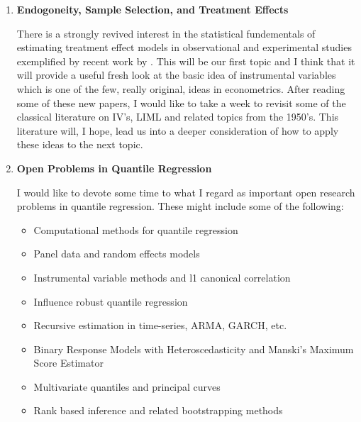 \begin{enumerate}

\item {\bf Endogoneity, Sample Selection, and Treatment Effects}

There is a strongly revived interest in the statistical fundementals
of estimating treatment effect models in observational and experimental
studies exemplified by recent work by 
\cite{air:1996,aai:1997,heckman:1996,ai:1994,Manski:1997}.
This will be our first topic and I think that it will provide a useful
fresh look at the basic idea of instrumental variables
which is one of the few, really original, ideas in econometrics.
After reading some of these new papers, I would like to take a week
to revisit some of the classical literature on IV's, LIML and related
topics from the 1950's.  This literature will, I hope, lead us into
a deeper consideration of how to apply these ideas to the next topic.


\item{\bf Open Problems in Quantile Regression}

I would like to devote some time to what I regard as important open research
problems in quantile regression.  These might include some of the following:

\begin{itemize}
\item Computational methods for quantile regression 
\cite{PK.1997,K.1997,P.1997,F.1997,KP.96}
\item  Panel data and random effects models 
\cite{Chay,Twins,rock:1983,mark:horo:1995}
\item Instrumental variable methods and l1 canonical correlation 
\cite{Amem:82,P:83,amma.93,Twins}
\item Influence robust quantile regression \cite{RH:97,HP:97,JWW:88}
\item Recursive estimation in time-series, ARMA, GARCH, etc. 
\cite{KZ.96,hols:1985,hols:1987,engl:hols:rupp:1988,rupp:1985}
\item Binary Response Models with Heteroscedasticity and
Manski's Maximum Score Estimator \cite{M.75,M.85,mt:86,horo}
\item Multivariate quantiles and principal curves 
\cite{Oja.83,NON,oja:niin:1985,niin:oja:tabl:1990,niin:oja:1995,CC,Chak,Chd.96,Liu,RS,Small:1990,Small,kolt,hast:stue:1989}
\item Rank based inference and related bootstrapping methods 
\cite{K.94,K.96,B.94,Bu.95,Hahn,GJ.92,GJKP.94,horo:97,parz:wei:ying:1994,Fitz.96,G.94,KM.98}
\end{itemize}


\end{enumerate}
